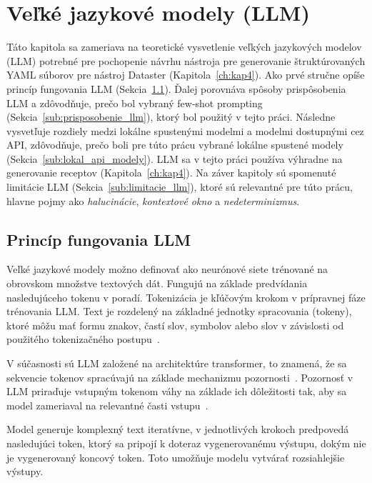 
\chapter{Veľké jazykové modely (LLM)}
\label{ch:kap3}

Táto kapitola sa zameriava na teoretické vysvetlenie veľkých jazykových modelov (LLM) potrebné pre pochopenie návrhu nástroja pre generovanie štruktúrovaných YAML súborov pre nástroj Dataster (Kapitola~\ref{ch:kap4}). Ako prvé stručne opíše princíp fungovania LLM (Sekcia~\ref{sub:co_je_llm}).  Ďalej porovnáva spôsoby prispôsobenia LLM a zdôvodňuje, prečo bol vybraný few-shot prompting (Sekcia~\ref{sub:prisposobenie_llm}), ktorý bol použitý v tejto práci. Následne vysvetľuje rozdiely medzi lokálne spustenými modelmi a modelmi dostupnými cez API, zdôvodňuje, prečo boli pre túto prácu vybrané lokálne spustené modely (Sekcia~\ref{sub:lokal_api_modely}). LLM sa v tejto práci používa výhradne na generovanie receptov (Kapitola~\ref{ch:kap4}). Na záver kapitoly sú spomenuté limitácie LLM (Sekcia~\ref{sub:limitacie_llm}), ktoré sú relevantné pre túto prácu, hlavne pojmy ako \textit{halucinácie}, \textit{kontextové okno} a \textit{nedeterminizmus}. 

\section{Princíp fungovania LLM}
\label{sub:co_je_llm}

Veľké jazykové modely možno definovať ako neurónové siete trénované na obrovskom množstve textových dát. Fungujú na základe predvídania nasledujúceho tokenu v poradí. Tokenizácia je kľúčovým krokom v prípravnej fáze trénovania LLM. Text je rozdelený na základné jednotky spracovania (tokeny), ktoré môžu mať formu znakov, častí slov, symbolov alebo slov v závislosti od použitého tokenizačného postupu~\cite{Naveed2024}. 


V súčasnosti sú LLM založené na architektúre transformer, to znamená, že sa sekvencie tokenov spracúvajú na základe mechanizmu pozornosti~\cite{Vaswani2017}. Pozornosť v LLM priraďuje vstupným tokenom váhy na základe ich dôležitosti tak, aby sa model zameriaval na relevantné časti vstupu~\cite{Naveed2024}.


Model generuje komplexný text iteratívne, v jednotlivých krokoch predpovedá nasledujúci token, ktorý sa pripojí k doteraz vygenerovanému výstupu, dokým nie je vygenerovaný koncový token. Toto umožňuje modelu vytvárať rozsiahlejšie výstupy.


